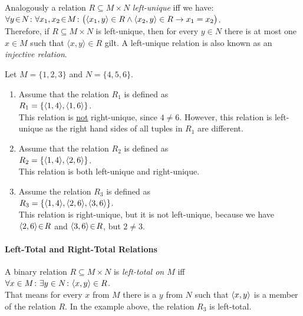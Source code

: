 Analogously a relation $R \subseteq M \times N$ \emph{left-unique} iff we have: \\[0.2cm]
\hspace*{1.3cm} 
$\forall y \!\in\! N \colon \forall x_1, x_2 \!\in\! M \colon \bigl(\langle x_1, y \rangle \in R \wedge \langle x_2, y \rangle \in R \rightarrow x_1 = x_2\bigr)$.
\\[0.2cm]
Therefore, if $R \subseteq M \times N$ is left-unique, then for every $y\in N$ there
is at most one $x \in M$ such that $\langle x, y \rangle \in R$ gilt.
A left-unique relation is also known as an \emph{injective relation}.

\example
Let $M = \{1,2,3\}$ and $N = \{4,5,6\}$.
\begin{enumerate}
\item Assume that the relation $R_1$ is defined as \\[0.2cm]
      \hspace*{1.3cm} $R_1 = \{ \pair(1,4), \pair(1,6) \}$. \\[0.2cm]
      This relation is  \underline{not} right-unique, since  $4 \not= 6$.
      However, this relation is left-unique as the right hand sides of all tuples
      in  $R_1$ are different.
\item Assume that the relation  $R_2$ is defined as \\[0.2cm]
      \hspace*{1.3cm} $R_2 = \{ \pair(1,4), \pair(2,6) \}$. \\[0.2cm]
      This relation is both left-unique and right-unique.
\item Assume the relation  $R_3$ is defined as \\[0.2cm]
      \hspace*{1.3cm} $R_3 = \{ \pair(1,4), \pair(2,6), \pair(3,6) \}$. \\[0.2cm]
      This relation is right-unique, but it is not left-unique, because we have
      $\pair(2,6) \el R$ and $\pair(3,6) \el R$, but $2 \not= 3$.
\end{enumerate}

\paragraph{Left-Total and Right-Total Relations}
A binary relation $R \subseteq M \times N$ is \emph{left-total on $M$} iff \\[0.2cm]
\hspace*{1.3cm} $\forall x \in M \colon \exists y \in N \colon \pair(x,y) \in R$. \\[0.2cm]
That means for every $x$ from $M$ there is a  $y$ from $N$ such that
$\pair(x,y)$ is a member of the relation $R$.  In the example above, the relation $R_3$ is
left-total.


